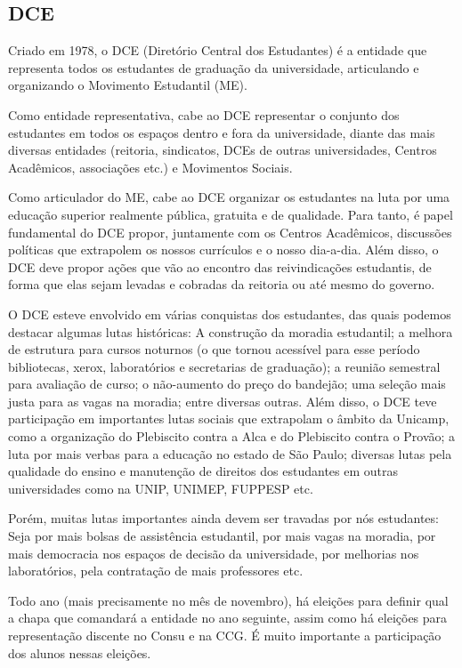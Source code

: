 \subsection{DCE}

Criado em 1978, o DCE (Diretório Central dos Estudantes) é a entidade que
representa todos os estudantes de graduação da universidade, articulando
e organizando o Movimento Estudantil (ME).

Como entidade representativa, cabe ao DCE representar o conjunto dos
estudantes em todos os espaços dentro e fora da universidade, diante das mais
diversas entidades (reitoria, sindicatos, DCEs de outras universidades, Centros
Acadêmicos, associações etc.) e Movimentos Sociais.

Como articulador do ME, cabe ao DCE organizar os estudantes na luta por uma
educação superior realmente pública, gratuita e de qualidade. Para tanto,
é papel fundamental do DCE propor, juntamente com os Centros Acadêmicos,
discussões políticas que extrapolem os nossos currículos e o nosso dia-a-dia.
Além disso, o DCE deve propor ações que vão ao encontro das reivindicações
estudantis, de forma que elas sejam levadas e cobradas da reitoria ou até mesmo
do governo.

O DCE esteve envolvido em várias conquistas dos estudantes, das quais podemos
destacar algumas lutas históricas: A construção da moradia estudantil; a melhora
de estrutura para cursos noturnos (o que tornou acessível para esse período
bibliotecas, xerox, laboratórios e secretarias de graduação); a reunião semestral
para avaliação de curso; o não-aumento do preço do bandejão; uma seleção mais
justa para as vagas na moradia; entre diversas outras. Além disso, o DCE teve
participação em importantes lutas sociais que extrapolam o âmbito da Unicamp,
como a organização do Plebiscito contra a Alca e do Plebiscito contra o Provão;
a luta por mais verbas para a educação no estado de São Paulo; diversas lutas
pela qualidade do ensino e manutenção de direitos dos estudantes em outras
universidades como na UNIP, UNIMEP, FUPPESP etc.

Porém, muitas lutas importantes ainda devem ser travadas por nós estudantes:
Seja por mais bolsas de assistência estudantil, por mais vagas na moradia, por
mais democracia nos espaços de decisão da universidade, por melhorias nos
laboratórios, pela contratação de mais professores etc.

Todo ano (mais precisamente no mês de novembro), há eleições para definir qual
a chapa que comandará a entidade no ano seguinte, assim como há eleições para
representação discente no Consu e na CCG. É muito importante a participação dos
alunos nessas eleições.

